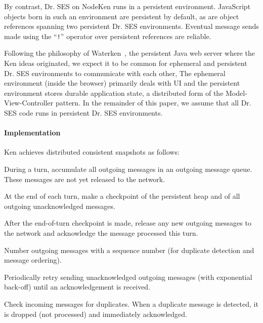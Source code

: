 \documentclass{llncs}
\begin{document}
By contrast, Dr. SES on NodeKen runs in a persistent environment. JavaScript objects born in such an environment are persistent by default, as are object references spanning two persistent Dr. SES environments. Eventual message sends made using the ``{\tt !}'' operator over persistent references are reliable.



Following the philosophy of Waterken~\cite{Close:Waterken}, the persistent Java web server where the Ken ideas originated, we expect it to be common for ephemeral and persistent Dr. SES environments to communicate with each other, The ephemeral environment (inside the browser) primarily deals with UI and the persistent environment stores durable application state, a distributed form of the Model-View-Controller pattern. In the remainder of this paper, we assume that all Dr. SES code runs in persistent Dr. SES environments.

\paragraph{Implementation} 

Ken achieves distributed consistent snapshots as follows:

\begin{itemize*}
\renewcommand{\labelitemi}{$\bullet$}
  \item During a turn, accumulate all outgoing messages in an outgoing message queue. These messages are not yet released to the network.
  \item At the end of each turn, make a checkpoint of the persistent heap and of all outgoing unacknowledged messages.
  \item After the end-of-turn checkpoint is made, release any new outgoing messages to the network and acknowledge the message processed this turn.
  \item Number outgoing messages with a sequence number (for duplicate detection and message ordering).
  \item Periodically retry sending unacknowledged outgoing messages (with exponential back-off) until an acknowledgement is received.
  \item Check incoming messages for duplicates. When a duplicate message is detected, it is dropped (not processed) and immediately acknowledged.
\end{itemize*}
\end{document}
